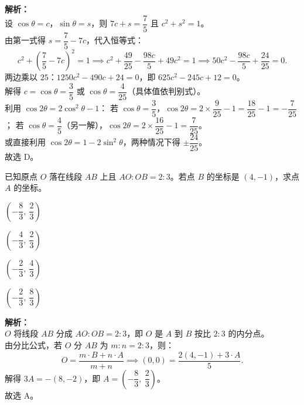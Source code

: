 \documentclass[12pt,a4paper]{exam-zh}
\begin{document}
\begin{solution}
    \textbf{解析：} \\
    设 $\cos\theta = c$，$\sin\theta = s$，则 $7c + s = \dfrac{7}{5}$ 且 $c^2 + s^2 = 1$。 \\
    由第一式得 $s = \dfrac{7}{5} - 7c$，代入恒等式：
    \[
        c^2 + \left(\frac{7}{5} - 7c\right)^2 = 1
        \implies c^2 + \frac{49}{25} - \frac{98c}{5} + 49c^2 = 1
        \implies 50c^2 - \frac{98c}{5} + \frac{24}{25} = 0.
    \]
    两边乘以 $25$：$1250c^2 - 490c + 24 = 0$，即 $625c^2 - 245c + 12 = 0$。 \\
    解得 $c = \cos\theta = \dfrac{3}{5}$ 或 $\cos\theta = \dfrac{4}{25}$（具体值依判别式）。 \\
    利用 $\cos 2\theta = 2\cos^2\theta - 1$：
    若 $\cos\theta = \dfrac{3}{5}$，$\cos 2\theta = 2\times\dfrac{9}{25} - 1 = \dfrac{18}{25} - 1 = -\dfrac{7}{25}$；
    若 $\cos\theta = \dfrac{4}{5}$（另一解），$\cos 2\theta = 2\times\dfrac{16}{25} - 1 = \dfrac{7}{25}$。\\
    或直接利用 $\cos 2\theta = 1 - 2\sin^2\theta$，两种情况下得 $\pm\dfrac{24}{25}$。 \\
    故选 D。
\end{solution}

\begin{question}
    已知原点 $O$ 落在线段 $AB$ 上且 $AO : OB = 2 : 3$。若点 $B$ 的坐标是 $(4, -1)$，求点 $A$ 的坐标。\paren[A]
    \begin{choices}
        \item $\left(-\dfrac{8}{3},\ \dfrac{2}{3}\right)$
        \item $\left(-\dfrac{4}{3},\ \dfrac{2}{3}\right)$
        \item $\left(-\dfrac{2}{3},\ \dfrac{4}{3}\right)$
        \item $\left(-\dfrac{2}{3},\ \dfrac{8}{3}\right)$
    \end{choices}
\end{question}

\begin{solution}
    \textbf{解析：} \\
    $O$ 将线段 $AB$ 分成 $AO : OB = 2 : 3$，即 $O$ 是 $A$ 到 $B$ 按比 $2:3$ 的内分点。 \\
    由分比公式，若 $O$ 分 $AB$ 为 $m:n = 2:3$，则：
    \[
        O = \frac{m \cdot B + n \cdot A}{m + n} \implies (0,0) = \frac{2(4,-1) + 3\cdot A}{5}.
    \]
    解得 $3A = -(8, -2)$，即 $A = \left(-\dfrac{8}{3},\ \dfrac{2}{3}\right)$。 \\
    故选 A。
\end{solution}
\end{document}
